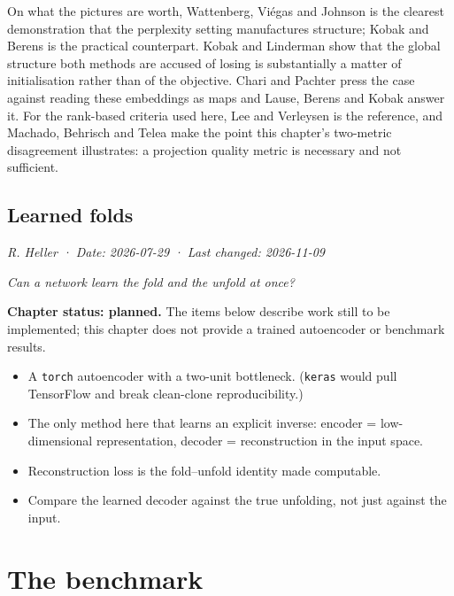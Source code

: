 \documentclass[
  british,
  a4paper,
]{book}
\providecommand{\tightlist}{%
  \setlength{\itemsep}{0pt}\setlength{\parskip}{0pt}}
\begin{document}
On what the pictures are worth, Wattenberg, Viégas and Johnson
\citep{wattenberg2016tsne} is the clearest demonstration that the perplexity setting
manufactures structure; Kobak and Berens \citep{kobak2019art} is the practical
counterpart. Kobak and Linderman \citep{kobak2021initialization} show that the
global structure both methods are accused of losing is substantially a matter
of initialisation rather than of the objective. Chari and Pachter
\citep{chari2023specious} press the case against reading these embeddings as maps
and Lause, Berens and Kobak \citep{lause2024elephant} answer it. For the rank-based
criteria used here, Lee and Verleysen \citep{lee2009quality} is the reference, and
Machado, Behrisch and Telea \citep{machado2025necessary} make the point this
chapter's two-metric disagreement illustrates: a projection quality metric is
necessary and not sufficient.

\chapter{Learned folds}\label{autoencoders}

\emph{R. Heller · Date: 2026-07-29 · Last changed: 2026-11-09}

\emph{Can a network learn the fold and the unfold at once?}

\textbf{Chapter status: planned.} The items below describe work still to be implemented; this chapter does not provide a trained autoencoder or benchmark results.

\begin{itemize}
\tightlist
\item
  A \texttt{torch} autoencoder with a two-unit bottleneck. (\texttt{keras} would pull TensorFlow and break clean-clone reproducibility.)
\item
  The only method here that learns an explicit inverse: encoder = low-dimensional representation, decoder = reconstruction in the input space.
\item
  Reconstruction loss is the fold--unfold identity made computable.
\item
  Compare the learned decoder against the true unfolding, not just against the input.
\end{itemize}

\part{The benchmark}\label{part-the-benchmark}
\end{document}
